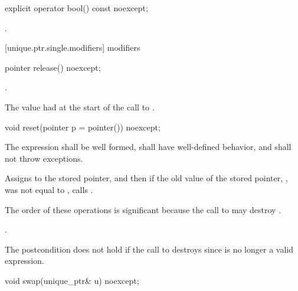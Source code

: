 %
\begin{itemdecl}
explicit operator bool() const noexcept;
\end{itemdecl}

\begin{itemdescr}
\pnum
\returns {}.
\end{itemdescr}

[unique.ptr.single.modifiers]{ modifiers}

%
\begin{itemdecl}
pointer release() noexcept;
\end{itemdecl}

\begin{itemdescr}
\pnum
\postcondition {}.

\pnum
\returns The value  had at the start of
the call to .
\end{itemdescr}

%
\begin{itemdecl}
void reset(pointer p = pointer()) noexcept;
\end{itemdecl}

\begin{itemdescr}
\pnum
\requires The expression  shall be well formed, shall have
well-defined behavior, and shall not throw exceptions.

\pnum
\effects Assigns  to the stored pointer, and then if the old value of the
stored pointer, , was not equal to , calls
. \begin{note} The order of these operations is significant
because the call to  may destroy . \end{note}

\pnum
\postcondition {}.
\begin{note} The postcondition does not hold if the call to 
destroys  since  is no longer a valid expression.
\end{note}
\end{itemdescr}

%
\begin{itemdecl}
void swap(unique_ptr& u) noexcept;
\end{itemdecl}

